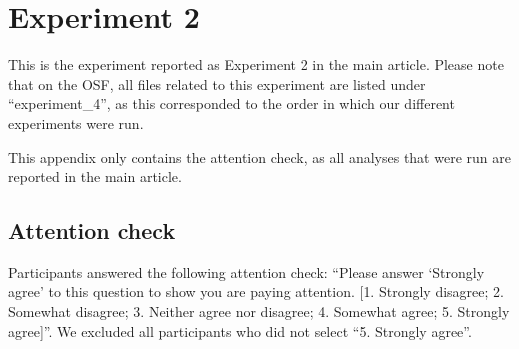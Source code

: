 \documentclass[
  english,
  doc,floatsintext]{apa6}
\begin{document}
\begin{table}
\centering\centering
\caption{\label{tab:exp2b-treatment-effects}Treatment effects by outcome}
\centering
{}
\end{table}

\clearpage

\section{Experiment 2}\label{exp2}

\FloatBarrier

This is the experiment reported as Experiment 2 in the main article. Please note that on the OSF, all files related to this experiment are listed under ``experiment\_4'', as this corresponded to the order in which our different experiments were run.

This appendix only contains the attention check, as all analyses that were run are reported in the main article.

\subsection{Attention check}\label{attention-check-3}

Participants answered the following attention check: ``Please answer `Strongly agree' to this question to show you are paying attention. {[}1. Strongly disagree; 2. Somewhat disagree; 3. Neither agree nor disagree; 4. Somewhat agree; 5. Strongly agree{]}''. We excluded all participants who did not select ``5. Strongly agree''.
\end{document}
